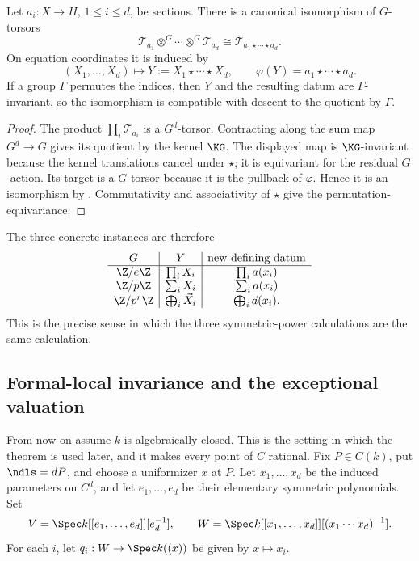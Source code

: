 \begin{prop}
\label{prop:parallel_cyclic_product_torsor}
Let $a_i:X\to H$, $1\leq i\leq d$, be sections. There is a canonical
isomorphism of $G$-torsors
\[
    \mathcal T_{a_1}\otimes^G\cdots\otimes^G\mathcal T_{a_d}
       \cong \mathcal T_{a_1\star\cdots\star a_d}.
\]
On equation coordinates it is induced by
\[
    (X_1,\dots,X_d)\longmapsto Y:=X_1\star\cdots\star X_d,
    \qquad
    \varphi(Y)=a_1\star\cdots\star a_d.
\]
If a group $\Gamma$ permutes the indices, then $Y$ and the resulting datum are
$\Gamma$-invariant, so the isomorphism is compatible with descent to the
quotient by $\Gamma$.
\end{prop}
\begin{proof}
The product $\prod_i\mathcal T_{a_i}$ is a $G^d$-torsor. Contracting along the sum
map $G^d\to G$ gives its quotient by the kernel $\KG$. The displayed map is
$\KG$-invariant because the kernel translations cancel under $\star$; it is
equivariant for the residual $G$-action. Its target is a $G$-torsor because it
is the pullback of $\varphi$. Hence it is an isomorphism by
. Commutativity and associativity of $\star$
give the permutation-equivariance.
\end{proof}

The three concrete instances are therefore
\[
\begin{array}{c|c|c}
G&Y&\text{new defining datum}\\ \hline
\Z/e\Z&\prod_iX_i&\prod_i a(x_i)\\
\Z/p\Z&\sum_iX_i&\sum_i a(x_i)\\
\Z/p^r\Z&\bigoplus_i\vec X_i&\bigoplus_i\vec a(x_i).
\end{array}
\]
This is the precise sense in which the three symmetric-power calculations are
the same calculation.

\subsection{Formal-local invariance and the exceptional valuation}

From now on assume $k$ is algebraically closed. This is the setting in which
the theorem is used later, and it makes every point of $C$ rational. Fix
$P\in C(k)$, put $\ndls=dP$, and choose a uniformizer $x$ at $P$. Let
$x_1,\dots,x_d$ be the induced parameters on $C^d$, and let
$e_1,\dots,e_d$ be their elementary symmetric polynomials. Set
\[
 V=\Spec k[[e_1,\dots,e_d]][e_d^{-1}],\qquad
 W=\Spec k[[x_1,\dots,x_d]][(x_1\cdots x_d)^{-1}].
\]
For each $i$, let $q_i:W\to\Spec k((x))$ be given by $x\mapsto x_i$.

